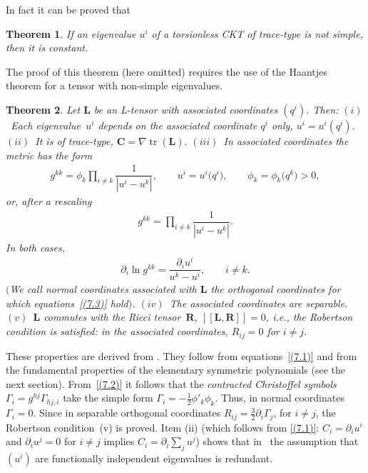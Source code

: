 \documentclass[10pt,a4paper]{amsart}
\def\bs{\boldsymbol}
\numberwithin{equation}{section}
\newtheorem{Theorem}{Theorem}[section]
 { \theoremstyle{definition}
\newtheorem{Notation}[Theorem]{Notation}
\newtheorem{Example}[Theorem]{Example}
\newtheorem{Remark}[Theorem]{Remark}
\newtheorem{Remarks}[Theorem]{Remarks}
 }
\begin{document}
In fact it can be proved that

\begin{Theorem}\label{t:7.1}
If an eigenvalue $u^i$ of a torsionless CKT of trace-type is not simple, then it is constant.
\end{Theorem}

The proof of this theorem (here omitted) requires the use of the Haantjes theorem for a tensor with non-simple eigenvalues.

\begin{Theorem}\label{t:7.2}\sloppy
Let $\bs L$ be an L-tensor with associated coordinates $(q^i)$. Then:
$(i)$~Each eigenva\-lue~$u^i$ depends on the associated coordinate $q^i$ only, $u^i=u^i(q^i)$.
$(ii)$~It is of trace-type, $\bs C=\nabla\operatorname{tr}(\bs L).$
$(iii)$~In associated coordinates the metric has the form
\begin{gather}
g^{kk}=\phi_k \prod_{i\neq k}\dfrac 1{|u^i-u^k|}, \qquad u^i=u^i\big(q^i\big), \qquad\phi_k=\phi_k\big(q^k\big)>0,
\label{(7.2)}
\end{gather}
or, after a rescaling
\begin{gather}
g^{kk}=\prod_{i\neq k}\dfrac 1{|u^i-u^k|}.
\label{(7.3)}
\end{gather}
In both cases,
\begin{gather*}
\partial_i\ln g^{kk}=\dfrac {\partial_i u^i}{u^k-u^i},\qquad  i\neq k.
\end{gather*}
$($We call  normal coordinates associated with $\bs L$ the orthogonal coordinates for which equa\-tions~\eqref{(7.3)} hold$)$. $(iv)$~The associated coordinates are separable.
$(v)$~$\bs L$ commutes with the Ricci ten\-sor~$\bs R$, $[\! [\bs L,\bs R]\! ]=0$, i.e.,  the Robertson condition is satisfied: in the associated coordinates, $R_{ij}=0$ for $i\neq j$.
\end{Theorem}

These properties are derived from \cite{Benenti-1992b,Benenti-1993}. They follow from equations~\eqref{(7.1)} and from the fundamental properties of the elementary symmetric polynomials (see the next section).
From~\eqref{(7.2)} it follows that the {\it contracted Christoffel symbols} $\Gamma_i=g^{hj}\Gamma_{hj,i}$ take the simple form
$\Gamma_i=-\tfrac 12 \phi'_k\phi_k$. Thus, in normal coordinates $\Gamma_i=0$. Since in separable orthogonal coordinates
$R_{ij}=\tfrac 32 \partial_i\Gamma_j$, for $i\neq j$, the Robertson condition~(v) is proved. Item (ii) (which follows from \eqref{(7.1)}: $C_i=\partial_iu^i$ and $\partial_iu^j=0$ for $i\neq j$ implies $C_i=\partial_i\sum_ju^j$) shows that in~\cite[Proposition~1, Section~1]{Crampin-2003a} the assumption that~$(u^i)$ are functionally independent eigenvalues is redundant.
\end{document}
